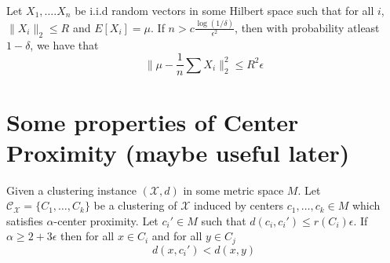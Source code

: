 \documentclass[orivec]{llncs}
\newcommand{\mc}{\mathcal}
\begin{document}
\begin{theorem}
\label{thm:genHoeff}
Let $X_1, \ldots. X_n$ be i.i.d random vectors in some Hilbert space such that for all $i$, $\|X_i\|_2 \le R$ and $E[X_i] = \mu$. If $n > c\frac{\log(1/\delta)}{\epsilon^2}$, then with probability atleast $1-\delta$, we have that
$$\Big\|\mu - \frac{1}{n}\sum X_i\Big\|_2^2 \le R^2\epsilon$$ 
\end{theorem}

\section{Some properties of Center Proximity (maybe useful later)}
\begin{lemma}
\label{lemma:hasPropertyR}
Given a clustering instance $(\mc X, d)$ in some metric space $M$. Let $\mc C_{\mc X} = \{C_1, \ldots, C_k\}$ be a clustering of $\mc X$ induced by centers $c_1, \ldots, c_k \in M$ which satisfies $\alpha$-center proximity. Let $c_i' \in M$ such that $d(c_i, c_i') \le r(C_i)\epsilon$. If $\alpha \ge 2 + 3\epsilon$ then for all $x \in C_i$ and for all $y \in C_j$
$$d(x, c_i') < d(x, y)$$  
\end{lemma}
\end{document}
